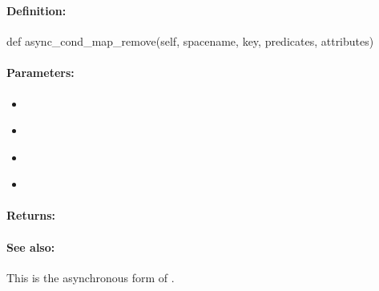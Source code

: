 \pagebreak
\subsubsection{}
\label{api:python:async_cond_map_remove}


\paragraph{Definition:}
\begin{pythoncode}
def async_cond_map_remove(self, spacename, key, predicates, attributes)
\end{pythoncode}

\paragraph{Parameters:}
\begin{itemize}[noitemsep]
\item {}\\

\item {}\\

\item {}\\

\item {}\\

\end{itemize}

\paragraph{Returns:}


\paragraph{See also:}  This is the asynchronous form of .

\pagebreak
\subsubsection{}
\label{api:python:group_map_remove}



